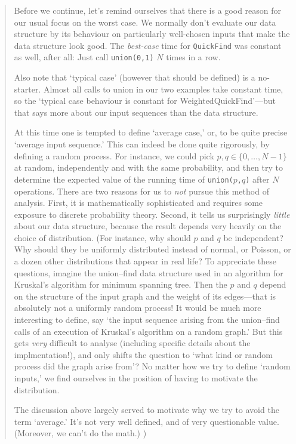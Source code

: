 \documentclass{tufte-handout}
\begin{document}
\begin{quotation}
  Before we continue, let's remind ourselves that there is a good reason for our usual focus on the worst case.
  We normally don't evaluate our data structure by its behaviour on particularly well-chosen inputs that make the data structure look good. 
  The \emph{best-case} time for {\tt QuickFind} was constant as well, after all: Just call {\tt union(0,1)} $N$ times in a row.

  Also note that `typical case' (however that should be defined) is a no-starter.
  Almost all calls to union in our two examples take constant time, so the `typical case behaviour is constant for {WeightedQuickFind}'---but that says more about our input sequences than the data structure.

  At this time one is tempted to define `average case,' or, to be quite precise `average input sequence.'
  This can indeed be done quite rigorously, by defining a random process.
  For instance, we could pick $p,q\in\{0,\ldots, N-1\}$ at random, independently and with the same probability, and then try to determine the expected value of the running time of {\tt union($p$,$q$)} after $N$ operations.
  There are two reasons for us to \emph{not} pursue this method of analysis.
  First, it is mathematically sophisticated and requires some exposure to discrete probability theory.
  Second, it tells us surprisingly \emph{little} about our data structure, because the result depends very heavily on the choice of distribution.
  (For instance, why should $p$ and $q$ be independent? 
  Why should they be uniformly distributed instead of normal, or Poisson, or a dozen other distributions that appear in real life?
  To appreciate these questions, imagine the union--find data structure used in an algorithm for Kruskal's algorithm for minimum spanning tree.
  Then the $p$ and $q$ depend on the structure of the input graph and the weight of its edges---that is absolutely not a uniformly random process!
  It would be much more interesting to define, say `the input sequence arising from the union--find calls of an execution of Kruskal's algorithm on a random graph.'
  But this gets \emph{very} difficult to analyse (including specific details about the implmentation!), and only shifts the question to `what kind or random process did the graph arise from'?
  No matter how we try to define `random inputs,' we find ourselves in the position of having to motivate the distribution.
  
  The discussion above largely served to motivate why we try to avoid the term `average.'
  It's not very well defined, and of very questionable value.
  (Moreover, we can't do the math.)
  )
\end{quotation}
\end{document}
